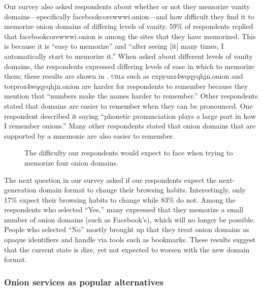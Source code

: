 Our survey also asked respondents about whether or not they memorize vanity
domains---specifically facebookcorewwwi.onion---and how difficult they find it
to memorize onion domains of differing levels of vanity.  59\% of respondents
replied that facebookcorewwwi.onion is among the sites that they have memorized.
This is because it is ``easy to memorize'' and ``after seeing [it] many times, I
automatically start to memorize it.''  When asked about different levels of
vanity domains, the respondents expressed differing levels of ease in which to
memorize them; these results are shown in .
\textsc{url}s such as expyuzz4wqqyqhjn.onion and torproz4wqqyqhjn.onion are
harder for respondents to remember because they mention that ``numbers make the
names harder to remember.''  Other respondents stated that domains are easier to
remember when they can be pronounced.  One respondent described it saying
``phonetic pronunciation plays a large part in how I remember onions.'' Many
other respondents stated that onion domains that are supported by a mnemonic are
also easier to remember.  

\begin{figure}[t]
    \centering
    
    \caption{The difficulty our respondents would expect to face when trying to
    memorize four onion domains.}
    \label{fig:memorize-domains}
\end{figure}

The next question in our survey asked if our respondents expect the
next-generation domain format to change their browsing habits.  Interestingly,
only 17\% expect their browsing habits to change while 83\% do not.  Among the
respondents who selected ``Yes,'' many expressed that they memorize a small
number of onion domains (such as Facebook's), which will no longer be possible.
People who selected ``No'' mostly brought up that they treat onion domains as
opaque identifiers and handle via tools such as bookmarks.  These results
suggest that the current state is dire, yet not expected to worsen with the new
domain format.

\subsubsection{Onion services as popular alternatives}

